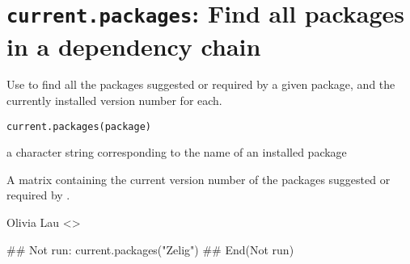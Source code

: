  \section{{\tt current.packages}: Find all packages in a dependency chain}\label{ss:current.packages}
\begin{Description}\relax
Use  to find all the packages suggested or 
required by a given package, and the currently installed version number 
for each.
\end{Description}
\begin{Usage}
\begin{verbatim}
current.packages(package)
\end{verbatim}
\end{Usage}
\begin{Arguments}
\begin{ldescription}
\item[\code{package}] a character string corresponding to the name of an 
installed package
\end{ldescription}
\end{Arguments}
\begin{Value}
A matrix containing the current version number of the packages 
suggested or required by .
\end{Value}
\begin{Author}\relax
Olivia Lau <>
\end{Author}
\begin{SeeAlso}\relax
{}
\end{SeeAlso}
\begin{Examples}
\begin{ExampleCode}
## Not run: 
current.packages("Zelig")
## End(Not run)\end{ExampleCode}
\end{Examples}


